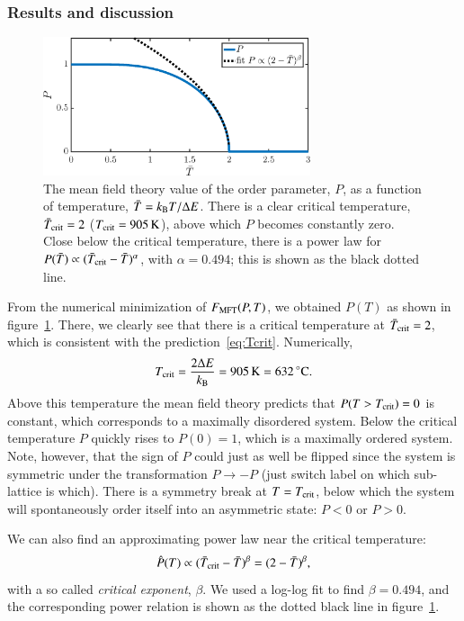 \subsubsection*{Results and discussion}
\begin{figure}[!ht]
\begin{center}
  \includegraphics[width=0.7\textwidth]{../figures/P_MFT} 
  \caption{The mean field theory value of the order parameter, $P$, as
  a function of temperature, $\bar{T}=k_\mathrm{B} T/\Delta{E}$. There is a
  clear critical temperature, $\bar{T}_{\rm crit}=2$
  ($T_{\rm crit}=\unit[905]{K}$), above which $P$ becomes constantly
  zero. Close below the critical temperature, there is a power law for
  $P(\bar{T})\propto(\bar{T}_{\rm crit}-\bar{T})^{\alpha}$, with
  $\alpha=0.494$; this is shown as the black dotted line. }
  \label{fig:T1:P}
\end{center}
\end{figure}

From the numerical minimization of $F_{\text{MFT}}(P,T)$, we obtained $P(T)$
as shown in figure~\ref{fig:T1:P}. There, we clearly see that there is
a critical temperature at $\bar{T}_{\rm crit}=2$, which is consistent with the prediction~\eqref{eq:Tcrit}. Numerically,
\begin{equation}
T_{\rm crit}=\frac{2\Delta{E}}{\kB}
=\unit[905]{K}=\unit[632]{^{\circ}C}.
\end{equation}
Above this temperature the mean field theory predicts that
$P(T>T_{\rm crit})=0$ is constant, which corresponds to a maximally
disordered system. Below the critical temperature $P$ quickly rises to
$P(0)=1$, which is a maximally ordered system. Note, however, that the
sign of $P$ could just as well be flipped since the system is
symmetric under the transformation $P\to-P$ (just switch label on
which sub-lattice is which). There is a symmetry break at $T=T_{\rm
  crit}$, below which the system will spontaneously order itself into
an asymmetric state: $P<0$ or $P>0$.

We can also find an approximating power law near the critical
temperature:
\begin{equation}\label{eq:alpha}
\hat{P}(T)\propto (\bar{T}_{\rm crit}-\bar{T})^{\beta}=(2-\bar{T})^{\beta},
\end{equation}
with a so called \emph{critical exponent}, $\beta$. We used a log-log
fit to find $\beta=0.494$, and the corresponding power relation is
shown as the dotted black line in figure~\ref{fig:T1:P}. 


